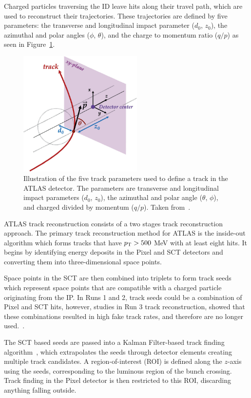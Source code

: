 Charged particles traversing the ID leave hits along their travel path, which are used to reconstruct their trajectories. These trajectories are defined by five parameters: the transverse and longitudinal impact parameter ($d_{0}$, $z_{0}$), the azimuthal and polar angles ($\phi$, $\theta$), and the charge to momentum ratio ($q/p$) as seen in Figure~\ref{fig:track_parameters}.

\begin{figure}[hpt]
  \centering
  \includegraphics[width=0.55\textwidth]{figures/reco/reco_track_parameters.png}
  \caption{Illustration of the five track parameters used to define a track in the ATLAS detector. The parameters are transverse and longitudinal impact parameters ($d_{0}$, $z_{0}$), the azimuthal and polar angle ($\theta$, $\phi$), and charged divided by momentum ($q/p$). Taken from~\cite{Mironova2023}.}\label{fig:track_parameters}
\end{figure}

ATLAS track reconstruction consists of a two stages track reconstruction approach. The primary track reconstruction method for ATLAS is the inside-out algorithm which forms tracks that have $p_{\mathrm{T}} > 500$ MeV with at least eight hits. It begins by identifying energy deposits in the Pixel and SCT detectors and converting them into three-dimensional space points. 

Space points in the SCT are then combined into triplets to form track seeds which represent space points that are compatible with a charged particle originating from the IP\@. In Runs 1 and 2, track seeds could be a combination of Pixel and SCT hits, however, studies in Run 3 track reconstruction, showed that these combinations resulted in high fake track rates, and therefore are no longer used.~\cite{ATL-PHYS-PUB-2023-034}.

The SCT based seeds are passed into a Kalman Filter-based track finding algorithm~\cite{kalman_filter}, which extrapolates the seeds through detector elements creating multiple track candidates. A region-of-interest (ROI) is defined along the $z$-axis using the seeds, corresponding to the luminous region of the bunch crossing. Track finding in the Pixel detector is then restricted to this ROI, discarding anything falling outside.

